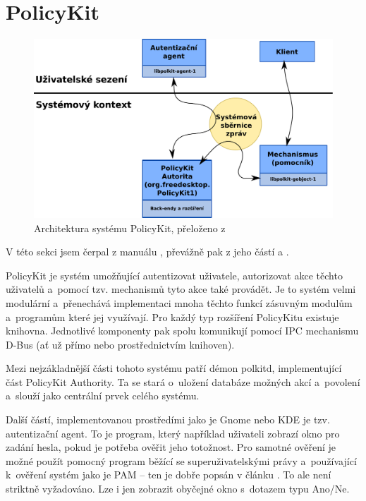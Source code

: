 \section{PolicyKit}
\begin{figure}[h]
    \centering
    \includegraphics[width=12cm]{obrazky/polkit-architecture-vector-cz.pdf}
    \caption{Architektura systému PolicyKit, přeloženo z \cite{manpolkit1}}
    \label{fig:polkit_arch}
\end{figure}

V této sekci jsem čerpal z manuálu \cite{manpolkit_overview}, převážně pak z jeho částí \cite{manpolkit1} a \cite{manpklocalauth}.

PolicyKit je systém umožňující autentizovat uživatele, autorizovat akce těchto uživatelů a~pomocí tzv. mechanismů tyto akce také provádět. Je to systém velmi modulární a~přenechává implementaci mnoha těchto funkcí zásuvným modulům a~programům které jej využívají. Pro každý typ rozšíření PolicyKitu existuje knihovna. Jednotlivé komponenty pak spolu komunikují pomocí IPC mechanismu D-Bus (ať už přímo nebo prostřednictvím knihoven).

Mezi nejzákladnější části tohoto systému patří démon polkitd, implementující část PolicyKit Authority. Ta se stará o~uložení databáze možných akcí a~povolení a~slouží jako centrální prvek celého systému.

Další částí, implementovanou prostředími jako je Gnome nebo KDE je tzv. autentizační agent. To je program, který například uživateli zobrazí okno pro zadání hesla, pokud je potřeba ověřit jeho totožnost. Pro samotné ověření je možné použít pomocný program běžící se superuživatelskými právy a~používající k~ověření systém jako je PAM -- ten je dobře popsán v článku \cite{rootpam}. To ale není striktně vyžadováno. Lze i jen zobrazit obyčejné okno s~dotazem typu Ano/Ne.

